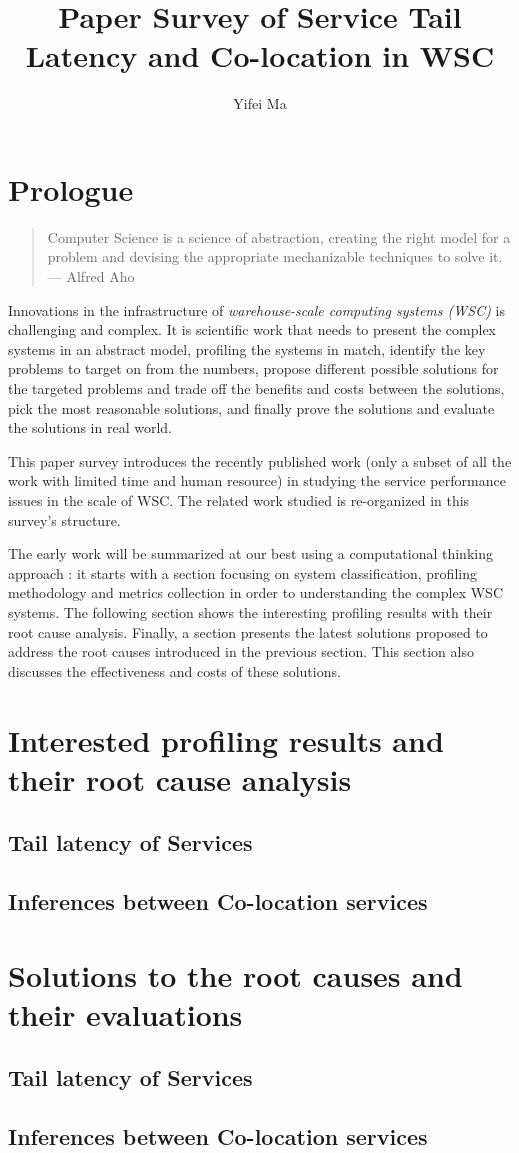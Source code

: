 \documentclass[
  journal=small,
  manuscript=article-type,  %
  year=2020,
  volume=37,
]{cup-journal}
\title{Paper Survey of Service Tail Latency and Co-location in WSC}
\author{Yifei Ma}
\affiliation{Bytedance}
\begin{document}
\section{Prologue}
\begin{quote}
Computer Science is a science of abstraction, creating the right model for a problem and devising the appropriate mechanizable techniques to solve it.  \linebreak[2]
--- Alfred Aho
\end{quote}
Innovations in the infrastructure of \textit{warehouse-scale computing systems (WSC)} \autocite{DBLP:series/synthesis/2018Barroso} is challenging and complex. It is scientific work that needs to present the complex systems in an abstract model, profiling the systems in match, identify the key problems to target on from the numbers, propose different possible solutions for the targeted problems and trade off the benefits and costs between the solutions, pick the most reasonable solutions, and finally prove the solutions and evaluate the solutions in real world.

This paper survey introduces the recently published work (only a subset of all the work with limited time and human resource) in studying the service performance issues in the scale of WSC. The related work studied is re-organized in this survey's structure.

The early work will be summarized at our best using a computational thinking approach \autocite{DBLP:journals/cacm/Wing06}: it starts with a section focusing on system classification, profiling methodology and metrics collection in order to understanding the complex WSC systems. The following section shows the interesting profiling results with their root cause analysis. Finally, a section presents the latest solutions proposed to address the root causes introduced in the previous section. This section also discusses the effectiveness and costs of these solutions.

\pagebreak
\tableofcontents



\section{Interested profiling results and their root cause analysis}
\subsection{Tail latency of Services}

\subsection{Inferences between Co-location services}

\pagebreak

\section{Solutions to the root causes and their evaluations}
\subsection{Tail latency of Services}

\subsection{Inferences between Co-location services}

\pagebreak
\printbibliography
\end{document}
